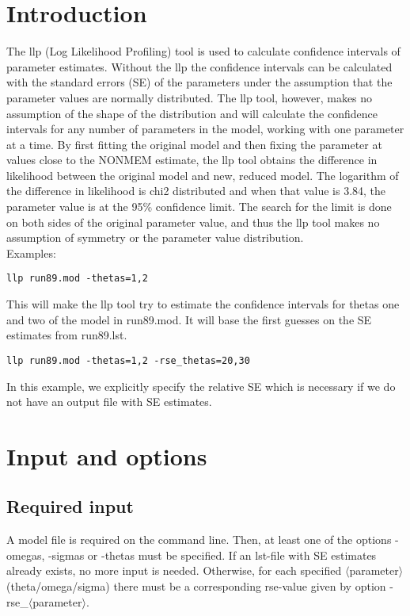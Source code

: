 
\usepackage{hyperref}


\maketitle
\newcommand{\guidetoolname}{llp}
\tableofcontents
\newpage

\section{Introduction}
The llp (Log Likelihood Profiling) tool is used to calculate confidence intervals of parameter estimates. Without the llp the confidence intervals can be calculated with the standard errors (SE) of the parameters under the assumption that the parameter values are normally distributed. The llp tool, however, makes no assumption of the shape of the distribution and will calculate the confidence intervals for any number of parameters in the model, working with one parameter at a time. By first fitting the original model and then fixing the parameter at values close to the NONMEM estimate, the llp tool obtains the difference in likelihood between the original model and new, reduced model. The logarithm of the difference in likelihood is chi2 distributed and when that value is 3.84, the parameter value is at the 95\% confidence limit. The search for the limit is done on both sides of the original parameter value, and thus the llp tool makes no assumption of symmetry or the parameter value distribution.\\
Examples:
\begin{verbatim}
llp run89.mod -thetas=1,2
\end{verbatim}
This will make the llp tool try to estimate the confidence intervals for thetas one and two of the model in run89.mod. It will base the first guesses on the SE estimates from run89.lst.
\begin{verbatim}
llp run89.mod -thetas=1,2 -rse_thetas=20,30
\end{verbatim}
In this example, we explicitly specify the relative SE which is necessary if we do not have an output file with SE estimates.
\section{Input and options}

\subsection{Required input}
A model file is required on the command line. Then, at least one of the options -omegas, -sigmas or -thetas must be specified. If an lst-file with SE estimates already exists, no more input is needed. Otherwise, for each specified $\langle$parameter$\rangle$ (theta/omega/sigma) there must be a corresponding rse-value given by option -rse\_$\langle$parameter$\rangle$. 

